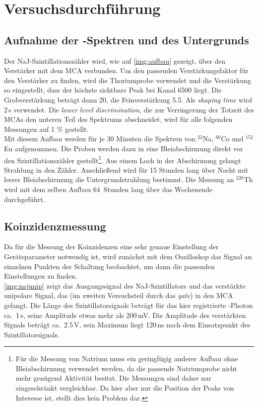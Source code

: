 \section{Versuchsdurchführung}

\subsection{Aufnahme der \textgamma-Spektren und des Untergrunds}
Der NaJ-Szintillationszähler wird, wie auf \autoref{img:aufbau} gezeigt, über den Verstärker mit
dem MCA verbunden.
Um den passenden Verstärkungsfaktor für den Verstärker zu finden, wird die Thoriumprobe verwendet
und die Verstärkung so eingestellt, dass der höchste sichtbare Peak bei Kanal 6500 liegt.
Die Grobverstärkung beträgt dann 20, die Feinverstärkung 5.5. Als \emph{shaping time} wird 2\,\textmu s verwendet.
Die \emph{lower level discrimination}, die zur Verringerung der Totzeit des MCAs den unteren Teil des
Spektrums abschneidet, wird für alle folgenden Messungen auf 1 \% gestellt.\\
Mit diesem Aufbau werden für je 30 Minuten die Spektren von ${}^{22}$Na, ${}^{60}$Co und ${}^{152}$Eu aufgenommen.
Die Proben werden dazu in eine Bleiabschirmung direkt vor den Szintillationszähler gestellt\footnote{Für die
Messung von Natrium muss ein geringfügig anderer Aufbau ohne Bleiabschirmung verwendet werden,
da die passende Natriumprobe nicht mehr genügend Aktivität besitzt.
Die Messungen sind daher nur eingeschränkt vergleichbar.
Da hier aber nur die Position der Peaks von Interesse ist, stellt dies kein Problem dar.}.
Aus einem Loch in der Abschirmung gelangt Strahlung in den Zähler.
Anschließend wird für 15 Stunden lang über Nacht mit leerer Bleiabschirmung die Untergrundstrahlung bestimmt.
Die Messung an ${}^{228}$Th wird mit dem selben Aufbau 64~Stunden lang über das Wochenende durchgeführt.

\subsection{Koinzidenzmessung}

Da für die Messung der Koinzidenzen eine sehr genaue Einstellung der Geräteparameter notwendig ist,
wird zunächst mit dem Oszilloskop das Signal an einzelnen Punkten der Schaltung beobachtet,
um dann die passenden Einstellungen zu finden.\\
\autoref{img:najunip} zeigt das Ausgangssignal des NaJ-Szintillators und das verstärkte unipolare Signal,
das (im zweiten Versuchsteil durch das \emph{gate}) in den MCA gelangt.
Die Länge des Szintillatorsignals beträgt für das hier registrierte \textgamma-Photon ca.~1\,\textmu s,
seine Amplitude etwas mehr als 200\,mV.
Die Amplitude des verstärkten Signals beträgt ca.~2.5\,V,
sein Maximum liegt 120\,ns nach dem Einsatzpunkt des Szintillatorsignals.\\

